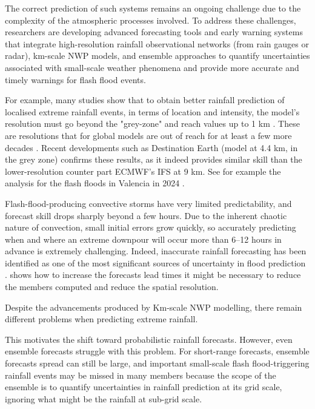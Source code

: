 The correct prediction of such systems remains an ongoing challenge due to the complexity of the atmospheric processes involved. To address these challenges, researchers are developing advanced forecasting tools and early warning systems that integrate high-resolution rainfall observational networks (from rain gauges or radar), km-scale NWP models, and ensemble approaches to quantify uncertainties associated with small-scale weather phenomena and provide more accurate and timely warnings for flash flood events.

For example, many studies show that to obtain better rainfall prediction of localised extreme rainfall events, in terms of location and intensity, the model's resolution must go beyond the "grey-zone" and reach values up to 1 km \citep{Castorina_2022}. These are resolutions that for global models are out of reach for at least a few more decades \citep{Zeman_2021}. Recent developments such as Destination Earth (model at 4.4 km, in the grey zone) confirms these results, as it indeed provides similar skill than the lower-resolution counter part ECMWF's IFS at 9 km. See for example the analysis for the flash floods in Valencia in 2024 \citep{Gascón_2025}.

Flash-flood-producing convective storms have very limited predictability, and forecast skill drops sharply beyond a few hours. Due to the inherent chaotic nature of convection, small initial errors grow quickly, so accurately predicting when and where an extreme downpour will occur more than 6–12 hours in advance is extremely challenging. Indeed, inaccurate rainfall forecasting has been identified as one of the most significant sources of uncertainty in flood prediction \citep{Hapuarachchi_2011}. \citet{Schwartz_2019a, Schwartz_2019b} shows how to increase the forecasts lead times it might be necessary to reduce the members computed and reduce the spatial resolution. 

Despite the advancements produced by Km-scale NWP modelling, there remain different problems when predicting extreme rainfall. 

This motivates the shift toward probabilistic rainfall forecasts. However, even ensemble forecasts struggle with this problem. For short-range forecasts, ensemble forecasts spread can still be large, and important small-scale flash flood-triggering rainfall events may be missed in many members because the scope of the ensemble is to quantify uncertainties in rainfall prediction at its grid scale, ignoring what might be the rainfall at sub-grid scale. 


